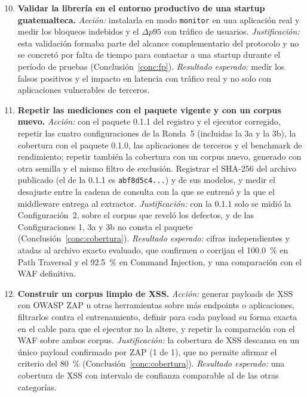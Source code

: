\begin{enumerate}
    \setcounter{enumi}{9}
    \item \textbf{Validar la librería en el entorno productivo de una startup guatemalteca.}
    \textit{Acción:} instalarla en modo \texttt{monitor} en una aplicación real y medir los
    bloqueos indebidos y el $\Delta p95$ con tráfico de usuarios. \textit{Justificación:} esta
    validación formaba parte del alcance complementario del protocolo y no se concretó por falta de
    tiempo para contactar a una startup durante el período de pruebas (Conclusión~\ref{conc:fp}).
    \textit{Resultado esperado:} medir los falsos positivos y el impacto en latencia con tráfico
    real y no solo con aplicaciones vulnerables de terceros.

    \item \textbf{Repetir las mediciones con el paquete vigente y con un corpus nuevo.}
    \textit{Acción:} con el paquete 0.1.1 del registro y el ejecutor corregido, repetir las cuatro
    configuraciones de la Ronda~5 (incluidas la 3a y la 3b), la cobertura con el paquete 0.1.0,
    las aplicaciones de terceros y el benchmark de rendimiento; repetir también la cobertura con
    un corpus nuevo, generado con otra semilla y el mismo filtro de exclusión. Registrar el SHA-256
    del archivo publicado (el de la 0.1.1 es \texttt{abf8d5c4...}) y de sus modelos, y medir el
    desajuste entre la cadena de consulta con la que se entrenó y la que el middleware entrega al
    extractor. \textit{Justificación:} con la 0.1.1 solo se midió la Configuración~2, sobre el
    corpus que reveló los defectos, y de las Configuraciones 1, 3a y 3b no consta el paquete
    (Conclusión~\ref{conc:cobertura}). \textit{Resultado esperado:} cifras independientes y atadas
    al archivo exacto evaluado, que confirmen o corrijan el 100.0~\% en Path Traversal y el
    92.5~\% en Command Injection, y una comparación con el WAF definitiva.

    \item \textbf{Construir un corpus limpio de XSS.} \textit{Acción:} generar payloads de XSS
    con OWASP ZAP u otras herramientas sobre más endpoints o aplicaciones, filtrarlos contra el
    entrenamiento, definir para cada payload su forma exacta en el cable para que el ejecutor no la
    altere, y repetir la comparación con el WAF sobre ambos corpus. \textit{Justificación:} la
    cobertura de XSS descansa en un único payload confirmado por ZAP (1 de 1), que no permite
    afirmar el criterio del 80~\% (Conclusión~\ref{conc:cobertura}). \textit{Resultado esperado:}
    una cobertura de XSS con intervalo de confianza comparable al de las otras categorías.


\end{enumerate}
